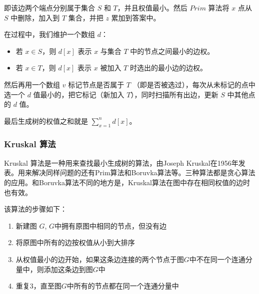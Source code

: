 \documentclass[12pt,a4paper]{article}
\begin{document}
即该边两个端点分别属于集合 $S$ 和 $T$，并且权值最小。然后 $Prim$ 算法将 $x$ 点从 $S$ 中删除，加入到 $T$ 集合，并把 $z$ 累加到答案中。

在过程中，我们维护一个数组 $d$：

\begin{itemize}[noitemsep]
    \item 若 $x\in S$，则 $d[x]$ 表示 $x$ 与集合 $T$ 中的节点之间最小的边权。
    \item 若 $x \in T$，则 $d[x]$ 表示 $x$ 被加入 $T$ 时选出的最小边的边权。
\end{itemize}

然后再用一个数组 $v$ 标记节点是否属于 $T$ （即是否被选过），每次从未标记的点中选一个 $d$ 值最小的，把它标记（新加入 $T$），同时扫描所有出边，更新 $S$ 中其他点的 $d$ 值。

最后生成树的权值之和就是 $\sum_{x=1}^n d[x]$。

\subsubsection{Kruskal 算法}

Kruskal 算法是一种用来查找最小生成树的算法，由Joseph Kruskal在1956年发表。用来解决同样问题的还有Prim算法和Boruvka算法等。三种算法都是贪心算法的应用。和Boruvka算法不同的地方是，Kruskal算法在图中存在相同权值的边时也有效。

该算法的步骤如下：

\begin{enumerate}[itemsep=2pt,topsep=0pt,parsep=0pt]
    \item 新建图 $G$, $G$中拥有原图中相同的节点，但没有边
    \item 将原图中所有的边按权值从小到大排序
    \item 从权值最小的边开始，如果这条边连接的两个节点于图$G$中不在同一个连通分量中，则添加这条边到图$G$中
    \item 重复3，直至图$G$中所有的节点都在同一个连通分量中
\end{enumerate}
\end{document}
